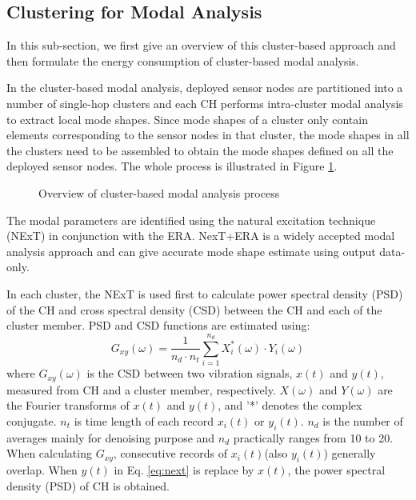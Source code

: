 \subsection{Clustering for Modal Analysis}
In this sub-section, we first give an overview of this cluster-based approach and then formulate the energy consumption of cluster-based modal analysis.

In the cluster-based modal analysis, deployed sensor nodes are partitioned into a number of single-hop clusters and each CH performs intra-cluster modal analysis to extract local mode shapes. Since mode shapes of a cluster only contain elements corresponding to the sensor nodes in that cluster, the mode shapes in all the clusters need to be assembled to obtain the mode shapes defined on all the deployed sensor nodes. The whole process is illustrated in Figure \ref{fig:clusterflow}.

\begin{figure}
	\centering
	\caption{Overview of cluster-based modal analysis process}
	\label{fig:clusterflow}
\end{figure}

The modal parameters are identified using the natural excitation technique (NExT)\cite{james1993natural} in conjunction with the ERA. NexT+ERA is a widely accepted modal analysis approach and can give accurate mode shape estimate using output data-only. 

In each cluster, the NExT is used first to calculate power spectral density (PSD) of the CH and cross spectral density (CSD) between the CH and each of the cluster member. PSD and CSD functions are estimated using:
\begin{equation}
G_{xy}(\omega)=\frac{1}{n_d\cdot n_t}\sum\limits_{i=1}^{n_d}X_i^*(\omega)\cdot Y_i(\omega) \label{eq:next}
\end{equation}
where \(G_{xy}(\omega)\) is the CSD between two vibration signals, \(x(t)\) and \(y(t)\), measured from CH and a cluster member, respectively. \(X(\omega)\) and \(Y(\omega)\) are the Fourier transforms of \(x(t)\) and \(y(t)\), and '*' denotes the complex conjugate. \(n_t\) is time length of each record \(x_i(t)\) or \(y_i(t)\). \(n_d\) is the number of averages mainly for denoising purpose and \(n_d\) practically ranges from 10 to 20. When calculating \(G_{xy}\), consecutive records of \(x_i(t)\)(also \(y_i(t)\)) generally overlap. When \(y(t)\) in Eq. \ref{eq:next} is replace by \(x(t)\), the power spectral density (PSD) of CH is obtained. 

